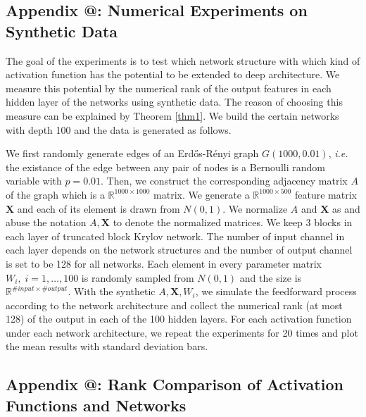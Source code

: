 \documentclass{article}
\makeatletter
\newcommand\ie{\textit{i.e.}}
\newcommand*{\rom}[1]{\expandafter\@slowromancap\romannumeral #1@}
\makeatother
\begin{document}
\subsection*{Appendix \rom{2}: Numerical Experiments on Synthetic Data}
\label{appendix:2}
The goal of the experiments is to test which network structure with which kind of activation function has the potential to be extended to deep architecture. We measure this potential by the numerical rank of the output features in each hidden layer of the networks using synthetic data. The reason of choosing this measure can be explained by Theorem \ref{thm1}. We build the certain networks with depth 100 and the data is generated as follows.

We first randomly generate edges of an Erd\H{o}s-R\'enyi graph $G(1000,0.01)$, \ie{} the existance of the edge between any pair of nodes is a Bernoulli random variable with $p = 0.01$.  Then, we construct the corresponding adjacency matrix $A$ of the graph which is a $\mathbb{R}^{1000 \times 1000} $ matrix. We generate a $\mathbb{R}^{1000 \times 500}$ feature matrix $\bm{X}$ and each of its element is drawn from $N(0,1)$. We normalize $A$ and $\bm{X}$ as \cite{kipf2016classification} and abuse the notation $A,\bm{X}$ to denote the normalized matrices. We keep 3 blocks in each layer of truncated block Krylov network. The number of input channel in each layer depends on the network structures and the number of output channel is set to be 128 for all networks. Each element in every parameter matrix $W_i, \; i = 1, \dots, 100$ is randomly sampled from $N(0,1)$ and the size is $\mathbb{R}^{\# input \times \#output}$. With the synthetic $A,\bm{X},W_i$, we simulate the feedforward process according to the network architecture and collect the numerical rank (at most 128) of the output in each of the 100 hidden layers. For each activation function under each network architecture, we repeat the experiments for 20 times and plot the mean results with standard deviation bars.
\subsection*{Appendix \rom{3}: Rank Comparison of Activation Functions and Networks}
\label{appendix:3}
\begin{figure*}[htbp]
\centering
{}}
\hfill
\subfloat[Snowball]{
\captionsetup{justification = centering}
\texttt{[image: \{fig\_snowball\_compare\_all]}.pdf}}
\hfill
\subfloat[Truncated Block Krylov]{
\captionsetup{justification = centering}
\texttt{[image: \{fig\_truncated\_krylov\_compare\_all]}.pdf}}
\caption{Column ranks of different activation functions with the same architecture}
\end{figure*}
\end{document}
